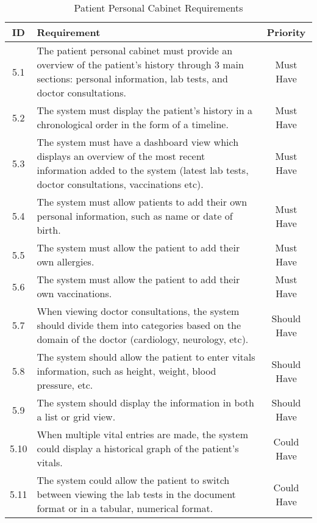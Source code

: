 \begin{table}[h!]
    \centering
    \begin{tabular}{|c|p{10cm}|c|}
    \hline
    \textbf{ID}  & \textbf{Requirement}  & \textbf{Priority} \\ \hline
    5.1  & The patient personal cabinet must provide an overview of the patient's history through 3 main sections: personal information, lab tests, and doctor consultations. & Must Have \\ \hline
    5.2  & The system must display the patient's history in a chronological order in the form of a timeline. & Must Have \\ \hline
    5.3 & The system must have a dashboard view which displays an overview of the most recent information added to the system (latest lab tests, doctor consultations, vaccinations etc). & Must Have \\ \hline
    5.4  & The system must allow patients to add their own personal information, such as name or date of birth. & Must Have \\ \hline
    5.5  & The system must allow the patient to add their own allergies. & Must Have \\ \hline
    5.6  & The system must allow the patient to add their own vaccinations. & Must Have \\ \hline
    5.7  & When viewing doctor consultations, the system should divide them into categories based on the domain of the doctor (cardiology, neurology, etc). & Should Have \\ \hline
    5.8  & The system should allow the patient to enter vitals information, such as height, weight, blood pressure, etc. & Should Have \\ \hline
    5.9  & The system should display the information in both a list or grid view. & Should Have \\ \hline
    5.10  & When multiple vital entries are made, the system could display a historical graph of the patient's vitals. & Could Have \\ \hline
    5.11 & The system could allow the patient to switch between viewing the lab tests in the document format or in a tabular, numerical format. & Could Have \\ \hline
    \end{tabular}
    \caption{Patient Personal Cabinet Requirements}
\end{table}

